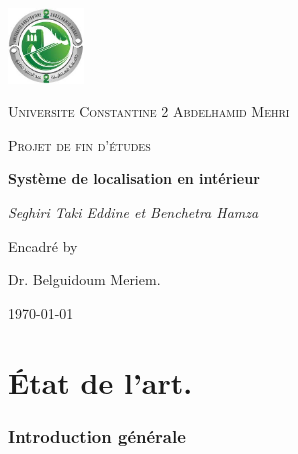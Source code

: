 \documentclass[12pt,a4paper]{report}
\begin{document}
	
	\begin{titlepage}
		\centering
		\includegraphics[width=0.15\textwidth]{logo.jpg}\par
		\vspace{1cm}
		{\scshape\LARGE Universite Constantine 2 Abdelhamid Mehri \par}
		\vspace{1cm}
		{\scshape\Large Projet de fin d'études\par}
		\vspace{1.5cm}
		{\huge\bfseries Système de localisation en intérieur\par}
		\vspace{2cm}
		{\Large\itshape Seghiri Taki Eddine et Benchetra Hamza\par}
		\vfill
		Encadré by\par
		Dr. Belguidoum Meriem.
		
		\vfill
		{\large \today\par}
	\end{titlepage}
	
	\tableofcontents
	\listoffigures
	
	
\part{État de l'art.}
\section*{Introduction générale}
\end{document}
